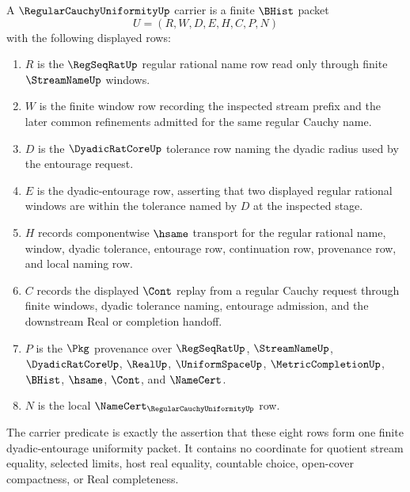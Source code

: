 \begin{definition}
\label{def:regular-cauchy-uniformity-carrier}
A $\RegularCauchyUniformityUp$ carrier is a finite $\BHist$ packet
$$
U=(R,W,D,E,H,C,P,N)
$$
with the following displayed rows:
\begin{enumerate}
\item $R$ is the $\RegSeqRatUp$ regular rational name row read only through finite $\StreamNameUp$ windows.
\item $W$ is the finite window row recording the inspected stream prefix and the later common refinements admitted for the same regular Cauchy name.
\item $D$ is the $\DyadicRatCoreUp$ tolerance row naming the dyadic radius used by the entourage request.
\item $E$ is the dyadic-entourage row, asserting that two displayed regular rational windows are within the tolerance named by $D$ at the inspected stage.
\item $H$ records componentwise $\hsame$ transport for the regular rational name, window, dyadic tolerance, entourage row, continuation row, provenance row, and local naming row.
\item $C$ records the displayed $\Cont$ replay from a regular Cauchy request through finite windows, dyadic tolerance naming, entourage admission, and the downstream Real or completion handoff.
\item $P$ is the $\Pkg$ provenance over $\RegSeqRatUp$, $\StreamNameUp$, $\DyadicRatCoreUp$, $\RealUp$, $\UniformSpaceUp$, $\MetricCompletionUp$, $\BHist$, $\hsame$, $\Cont$, and $\NameCert$.
\item $N$ is the local $\NameCert_{\RegularCauchyUniformityUp}$ row.
\end{enumerate}
The carrier predicate is exactly the assertion that these eight rows form one finite dyadic-entourage uniformity packet. It contains no coordinate for quotient stream equality, selected limits, host real equality, countable choice, open-cover compactness, or Real completeness.
\end{definition}

